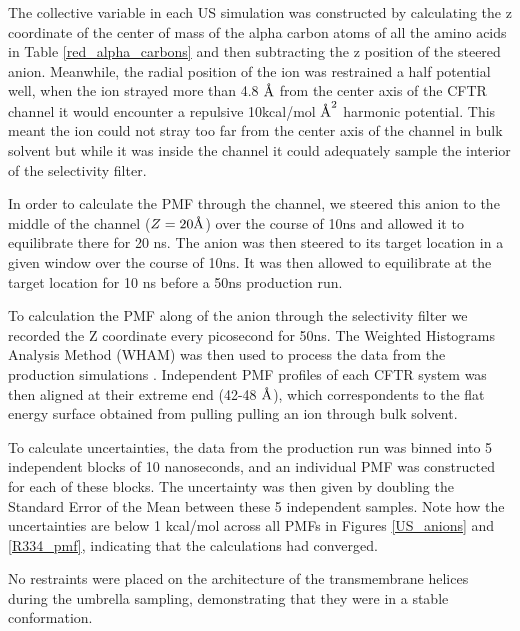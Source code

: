 The collective variable in each US simulation was constructed by calculating the z coordinate of the center of mass of the alpha carbon atoms of all the amino acids in Table \ref{red_alpha_carbons} and then subtracting the z position of the steered anion. Meanwhile, the radial position of the ion was restrained a half potential well, when the ion strayed more than 4.8 $\textup{\AA}$ from the center axis of the CFTR channel it would encounter a repulsive 10kcal/mol $\textup{\AA}^2$ harmonic potential. This meant the ion could not stray too far from the center axis of the channel in bulk solvent but while it was inside the channel it could adequately sample the interior of the selectivity filter.

In order to calculate the PMF through the channel, we steered this anion to the middle of the channel ($Z=20\textup{\AA}$) over the course of 10ns and allowed it to equilibrate there for 20 ns. The anion was then steered to its target location in a given window over the course of 10ns. It was then allowed to equilibrate at the target location for 10 ns before a 50ns production run.

To calculation the PMF along of the anion through the selectivity filter we recorded the Z coordinate every picosecond for 50ns. The Weighted Histograms Analysis Method (WHAM) was then used to process the data from the production simulations \cite{grossfield2012}. Independent PMF profiles of each CFTR system was then aligned at their extreme end (42-48 $\textup{\AA}$), which correspondents to the flat energy surface obtained from pulling pulling an ion through bulk solvent. 

To calculate uncertainties, the data from the production run was binned into 5 independent blocks of 10 nanoseconds, and an individual PMF was constructed for each of these blocks. The uncertainty was then given by doubling the Standard Error of the Mean between these 5 independent samples. Note how the uncertainties are below 1 kcal/mol across all PMFs in Figures \ref{US_anions} and \ref{R334_pmf}, indicating that the calculations had converged.

No restraints were placed on the architecture of the transmembrane helices during the umbrella sampling, demonstrating that they were in a stable conformation. 
